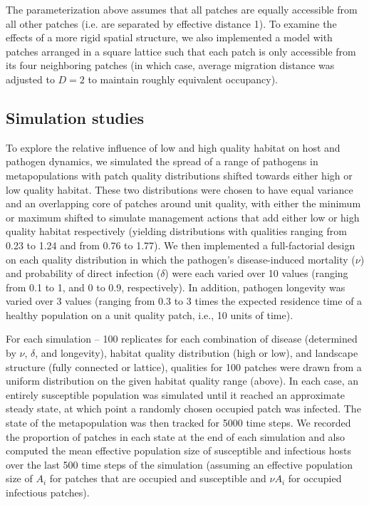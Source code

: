 \documentclass{article}
\begin{document}
The parameterization above assumes that all patches are equally accessible from all other patches (i.e. are separated by effective distance 1).  To examine the effects of a more rigid spatial structure, we also implemented a model with patches arranged in a square lattice such that each patch is only accessible from its four neighboring patches (in which case, average migration distance was adjusted to $D = 2$ to maintain roughly equivalent occupancy).  

\subsection{Simulation studies}

To explore the relative influence of low and high quality habitat on host and pathogen dynamics, we simulated the spread of a range of pathogens in metapopulations with patch quality distributions shifted towards either high or low quality habitat.
These two distributions were chosen to have equal variance and an overlapping core of patches around unit quality, with either the minimum or maximum shifted to simulate management actions that add either low or high quality habitat respectively (yielding distributions with qualities ranging from 0.23 to 1.24 and from 0.76 to 1.77).  
We then implemented a full-factorial design on each quality distribution in which the pathogen's disease-induced mortality ($\nu$) and probability of direct infection ($\delta$) were each varied over 10 values (ranging from 0.1 to 1, and 0 to 0.9, respectively).  In addition, pathogen longevity was varied over 3 values (ranging from 0.3 to 3 times the expected residence time of a healthy population on a unit quality patch, i.e., 10 units of time).

For each simulation -- 100 replicates for each combination of disease (determined by $\nu$, $\delta$, and longevity), habitat quality distribution (high or low), and landscape structure (fully connected or lattice), qualities for 100 patches were drawn from a uniform distribution on the given habitat quality range (above). In each case, an entirely susceptible population was simulated until it reached an approximate steady state, at which point a randomly chosen occupied patch was infected.  The state of the metapopulation was then tracked for 5000 time steps.  We recorded the proportion of patches in each state at the end of each simulation and also computed the mean effective population size of susceptible and infectious hosts over the last 500 time steps of the simulation (assuming an effective population size of $A_i$ for patches that are occupied and susceptible and $\nu A_i$ for occupied infectious patches).    
\end{document}
